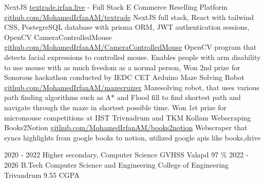 \documentclass[9pt]{developercv} %
\begin{document}
\begin{entrylist}
    \entry
    {NextJS}
    {\href{https://textrade.irfan.live/}{textrade.irfan.live} - Full Stack E Commerce Reselling Platform}
    {\href{https://github.com/MohamedIrfanAM/aleph-zero}{github.com/MohamedIrfanAM/textrade}}
    {NextJS full stack, React with tailwind CSS, PostegreSQL database with prisma ORM, JWT authentication sessions, }
    \entry
    {OpenCV}
    {CameraControlledMouse}
    {\href{https://github.com/MohamedIrfanAM/CameraControlledMouse}{github.com/MohamedIrfanAM/CameraControlledMouse}}
    {OpenCV program that detects facial expressions to controlled mouse. Enables people with arm disability to use mouse with as much freedom as a normal person, Won 2nd prize for Sonorous hackathon conducted by IEDC CET }
    \entry
    {Arduino}
    {Maze Solving Robot}
    {\href{https://github.com/MohamedIrfanAM/mazecruizer}{github.com/MohamedIrfanAM/mazecruizer}}
    {Mazesolving robot, that uses various path finding algorithms such as A* and Flood fill to find shortest path and navigate through the maze in shortest possible time. Won 1st prize for micromouse competitions at IIST Trivnadrum and TKM Kollam}
    \entry
    {Webscraping}
    {Books2Notion}
    {\href{https://github.com/MohamedIrfanAM/books2notion}{github.com/MohamedIrfanAM/books2notion}}
    {Webscraper that syncs highlights from google books to notion, utilized google apis like books,drive}
\end{entrylist}

\vspace{-10 pt}
\begin{entrylist}
    \entry
    {2020 - 2022}
    {Higher secondary, Computer Science}
    {GVHSS Valapd}
    {97 \%}
    \entry
    {2022 - 2026}
    {B.Tech Computer Science and Engineering}
    {College of Engineering Trivandrum}
    {9.55 CGPA}

\end{entrylist}
\end{document}
